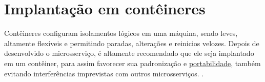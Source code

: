 



\section{Implantação em contêineres}

Contêineres configuram isolamentos lógicos em uma máquina, sendo leves, altamente flexíveis e permitindo paradas, alterações e reinicios velozes. Depois de desenvolvido o microsserviço, é altamente recomendado que ele seja implantado em um contêiner, para assim favorecer sua padronização e \hyperref[sec:portabilidade]{portabilidade}, também evitando interferências imprevistas com outros microsserviços. \cite{oracle_microservices}.


